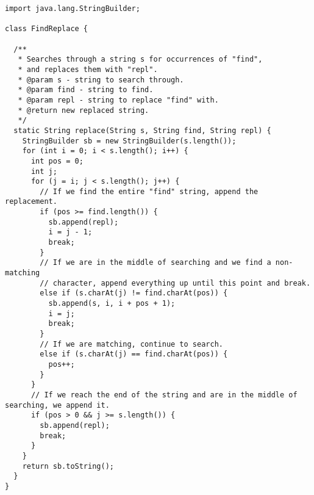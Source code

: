 \begin{lstlisting}[language=MyJava]
import java.lang.StringBuilder;

class FindReplace {

  /**
   * Searches through a string s for occurrences of "find", 
   * and replaces them with "repl".
   * @param s - string to search through.
   * @param find - string to find.
   * @param repl - string to replace "find" with.
   * @return new replaced string.
   */
  static String replace(String s, String find, String repl) {
    StringBuilder sb = new StringBuilder(s.length());
    for (int i = 0; i < s.length(); i++) {
      int pos = 0;
      int j;
      for (j = i; j < s.length(); j++) {
        // If we find the entire "find" string, append the replacement.
        if (pos >= find.length()) {
          sb.append(repl);
          i = j - 1;
          break;
        }
        // If we are in the middle of searching and we find a non-matching
        // character, append everything up until this point and break.
        else if (s.charAt(j) != find.charAt(pos)) {
          sb.append(s, i, i + pos + 1);
          i = j;
          break;
        }
        // If we are matching, continue to search.
        else if (s.charAt(j) == find.charAt(pos)) {
          pos++;
        }
      }
      // If we reach the end of the string and are in the middle of searching, we append it.
      if (pos > 0 && j >= s.length()) {
        sb.append(repl);
        break;
      }
    }
    return sb.toString();
  }
}
\end{lstlisting}



